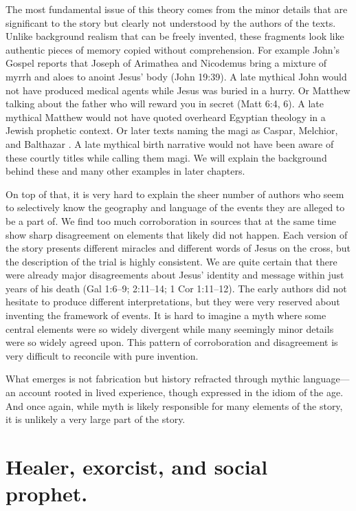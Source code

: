 The most fundamental issue of this theory comes from the minor details that are significant to the story but clearly not understood by the authors of the texts.
Unlike background realism that can be freely invented, these fragments look like authentic pieces of memory copied without comprehension.
For example John’s Gospel reports that Joseph of Arimathea and Nicodemus bring a mixture of myrrh and aloes to anoint Jesus’ body (John 19:39).
A late mythical John would not have produced medical agents while Jesus was buried in a hurry.
Or Matthew talking about the father who will reward you in secret (Matt 6:4, 6).
A late mythical Matthew would not have quoted overheard Egyptian theology in a Jewish prophetic context.
Or later texts naming the magi as Caspar, Melchior, and Balthazar \cite[86]{excerpta:barbari}.
A late mythical birth narrative would not have been aware of these courtly titles while calling them magi.
We will explain the background behind these and many other examples in later chapters.

On top of that, it is very hard to explain the sheer number of authors who seem to selectively know the geography and language of the events they are alleged to be a part of.
We find too much corroboration in sources that at the same time show sharp disagreement on elements that likely did not happen.
Each version of the story presents different miracles and different words of Jesus on the cross, but the description of the trial is highly consistent.
We are quite certain that there were already major disagreements about Jesus’ identity and message within just years of his death (Gal 1:6--9; 2:11--14; 1 Cor 1:11--12).
The early authors did not hesitate to produce different interpretations, but they were very reserved about inventing the framework of events.
It is hard to imagine a myth where some central elements were so widely divergent while many seemingly minor details were so widely agreed upon.
This pattern of corroboration and disagreement is very difficult to reconcile with pure invention.

What emerges is not fabrication but history refracted through mythic language---an account rooted in lived experience, though expressed in the idiom of the age.
And once again, while myth is likely responsible for many elements of the story, it is unlikely a very large part of the story.

\section{Healer, exorcist, and social prophet.}\label{sec:healer}

